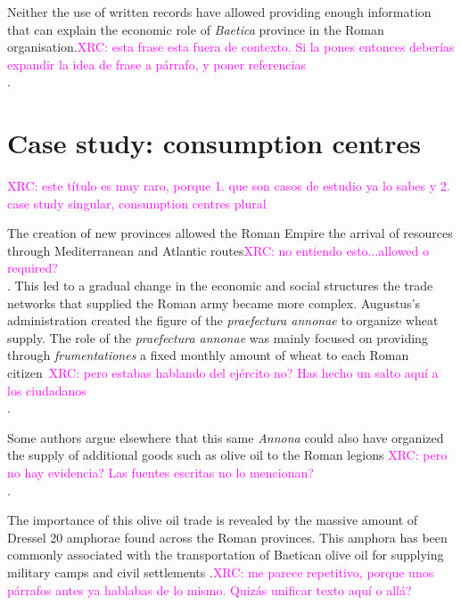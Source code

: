 \documentclass[review]{elsarticle}
\newcommand{\memo}[2]{\textcolor{#1}{#2}}
\newcommand{\xavi}[1]{\memo{magenta}{XRC: #1\\}}
\begin{document}
Neither the use of written records have allowed providing enough information that can explain the economic role of \textit{Baetica} province in the Roman organisation.\xavi{esta frase esta fuera de contexto. Si la pones entonces deberías expandir la idea de frase a párrafo, y poner referencias}.
  



\section{Case study: consumption centres}

\xavi{este título es muy raro, porque 1. que son casos de estudio ya lo sabes y 2. case study singular, consumption centres plural}

The creation of new provinces allowed the Roman Empire the arrival of resources through Mediterranean and Atlantic routes\xavi{no entiendo esto...allowed o required?}. This led to a gradual change in the economic and social structures the trade networks that supplied the Roman army became more complex. Augustus's administration created the figure of the \textit{praefectura annonae} to organize wheat supply. The role of the \textit{praefectura annonae} was mainly focused on providing through \textit{frumentationes} a fixed monthly amount of wheat to each Roman citizen~\citep{remesal_annona_1986,remesal_concierto}\xavi{pero estabas hablando del ejército no? Has hecho un salto aquí a los ciudadanos}. 

Some authors argue elsewhere that this same \textit{Annona} could also have organized the supply of additional goods such as olive oil to the Roman legions \citep{remesal_annona_1986,remesal_annona_1990}\xavi{pero no hay evidencia? Las fuentes escritas no lo mencionan?}.

The importance of this olive oil trade is revealed by the massive amount of Dressel 20 amphorae found across the Roman provinces. This amphora has been commonly associated with the transportation of Baetican olive oil for supplying military camps and civil settlements \citep{berni_millet_epigrafianforica_2008}.\xavi{me parece repetitivo, porque unos párrafos antes ya hablabas de lo mismo. Quizás unificar texto aquí o allá?}
 
\end{document}
